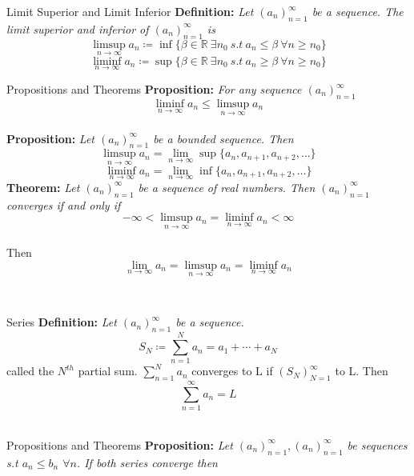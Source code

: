 \documentclass{article}
\begin{document}
\begin{multicols*}{3}
\begin{blackbox}{Limit Superior and Limit Inferior}
\textbf{Definition:}\textit{ Let $(a_n)_{n=1}^\infty$ be a sequence. The limit superior and inferior of $(a_n)_{n=1}^\infty$ is}\\[-4ex]
$$\limsup_{n\rightarrow \infty} a_n \coloneqq \inf \{\beta \in \mathbb{R} \ \exists n_0 \ s.t \ a_n \leq \beta \ \forall n\geq n_0\}$$
\[\liminf_{n\rightarrow \infty} a_n \coloneqq \sup\{\beta \in \mathbb{R} \ \exists n_0 \ s.t \ a_n \geq \beta \ \forall n\geq n_0\}\]
\begin{redbox}{Propositions and Theorems}
    \textbf{Proposition:}\textit{ For any sequence $(a_n)_{n=1}^\infty$}
        \[\liminf_{n \rightarrow \infty} a_n \leq \limsup_{n\rightarrow \infty} a_n\]\\[-3ex]
        \textbf{Proposition:}\textit{ Let $(a_n)_{n=1}^\infty$ be a bounded sequence. Then}\\[-2ex]
        \[\limsup_{n\rightarrow \infty} a_n = \lim_{n\rightarrow \infty} \sup \{a_n, a_{n+1}, a_{n+2}, \ldots\}\]
        \[\liminf_{n\rightarrow \infty} a_n = \lim_{n\rightarrow \infty} \inf \{a_n, a_{n+1}, a_{n+2}, \ldots\}\]
        \textbf{Theorem:}\textit{ Let $(a_n)_{n=1}^\infty$ be a sequence of real numbers. Then $(a_n)_{n=1}^\infty$ converges if and only if}
        $$-\infty < \limsup_{n\rightarrow \infty} a_n = \liminf_{n\rightarrow \infty} a_n < \infty$$\\[-4ex]
        Then\\[-3ex]
        \[\lim_{n\rightarrow \infty} a_n = \limsup_{n\rightarrow \infty} a_n = \liminf_{n\rightarrow \infty} a_n  \]
\end{redbox}\\[-3ex]
\end{blackbox}
\begin{blackbox}{Series}
    \textbf{Definition:}\textit{ Let $(a_n)_{n=1}^\infty$ be a sequence.}\\[-2ex]
        \[S_N \coloneqq \sum_{n=1}^N a_n = a_1 + \cdots + a_N\]
        called the $N^{th}$ partial sum. $\sum_{n=1}^N a_n$ converges to L if $(S_N)_{N=1}^\infty$ to L. Then \\[-2ex]
        \[\sum_{n=1}^\infty a_n = L\]\\[-1ex]
 \begin{bluebox}{Propositions and Theorems}
        \textbf{Proposition:}\textit{ Let $(a_n)_{n=1}^\infty, (a_n)_{n=1}^\infty$ be sequences s.t $a_n\leq b_n$ $\forall n$. If both series converge then}\\[-2ex]

\end{bluebox}
\end{blackbox}
\end{multicols*}
\end{document}
